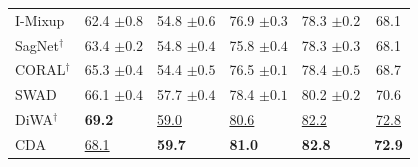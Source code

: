 \documentclass[10pt]{article}
\begin{document}
\begin{table}[H]
\begin{tabular}{lllll|c}
I-Mixup & 62.4 \scriptsize$\pm0.8$ & 54.8 \scriptsize$\pm0.6$ & 76.9 \scriptsize$\pm0.3$ & 78.3 \scriptsize$\pm0.2$ & 68.1 \\
SagNet$^\dagger$ & 63.4 \scriptsize$\pm0.2$ & 54.8 \scriptsize$\pm0.4$ & 75.8 \scriptsize$\pm0.4$ & 78.3 \scriptsize$\pm0.3$ & 68.1 \\
CORAL$^\dagger$ & 65.3 \scriptsize$\pm0.4$ & 54.4 \scriptsize$\pm0.5$ & 76.5 \scriptsize$\pm0.1$ & 78.4 \scriptsize$\pm0.5$ & 68.7 \\
SWAD & 66.1 \scriptsize$\pm0.4$ & 57.7 \scriptsize$\pm0.4$ & 78.4 \scriptsize$\pm0.1$ & 80.2 \scriptsize$\pm0.2$ & 70.6 \\
DiWA$^\dagger$ & \textbf{69.2} & \underline{59.0} & \underline{80.6} & \underline{82.2} & \underline{72.8} \\
\midrule
CDA & \underline{68.1} & \textbf{59.7} & \textbf{81.0} & \textbf{82.8} & \textbf{72.9} \\
\bottomrule
\end{tabular}
\end{table}
\end{document}
